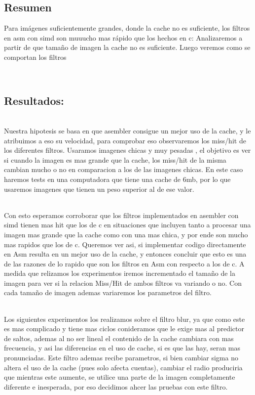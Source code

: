 \subsection{Resumen}

Para imágenes suficientemente grandes, donde la cache no es suficiente, los filtros en asm con simd son muuucho mas rápido que los hechos en c: Analizaremos a partir de que tamaño de imagen la cache no es suficiente. Luego veremos como se comportan los filtros

\\
\subsection{Resultados:}\\

Nuestra hipotesis se basa en que asembler consigue un mejor uso de la cache, y le atribuimos a eso su velocidad, para comprobar eso observaremos los miss/hit de los diferentes filtros. Usaramos imagenes chicas y muy pesadas , el objetivo es ver si cuando la imagen es mas grande que la cache, los miss/hit de la misma cambian mucho o no en comparacion a los de las imagenes chicas. En este caso haremos tests en una computadora que tiene una cache de 6mb, por lo que usaremos imagenes que tienen un peso superior al de ese valor. 

\\
Con esto esperamos corroborar que los filtros implementados en asembler con simd tienen mas hit que los de c en situaciones que incluyen tanto a procesar una imagen mas grande que la cache como con una mas chica, y por ende son mucho mas rapidos que los de c. Queremos ver asi, si implementar codigo directamente en Asm resulta en un mejor uso de la cache, y entonces concluir que esto es una de las razones de lo rapido que son los filtros en Asm con respecto a los de c. A medida que relizamos los experimentos iremos incrementado el tamaño de la imagen para ver si la relacion Miss/Hit de ambos filtros va variando o no. Con cada tamaño de imagen ademas variaremos los parametros del filtro. 

\\
Los siguientes experimentos los realizamos sobre el filtro blur, ya que como este es mas complicado y tiene mas ciclos conideramos que le exige mas al predictor de saltos, ademas al no ser lineal el contenido de la cache cambiara con mas frecuencia, y asi las diferencias en el uso de cache, si es que las hay, seran mas pronunciadas. Este filtro ademas recibe parametros, si bien cambiar sigma no altera el uso de la cache (pues solo afecta cuentas), cambiar el radio produciria que mientras este aumente, se utilice una parte de la imagen completamente diferente e inesperada, por eso decidimos ahcer las pruebas con este filtro.

